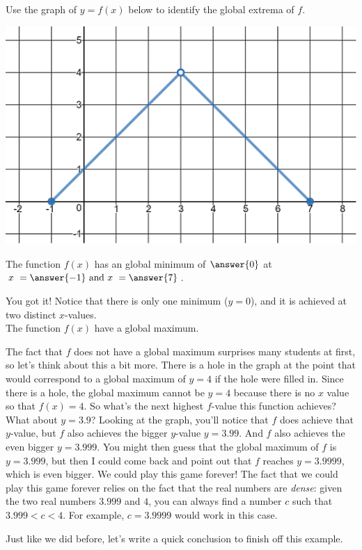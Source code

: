 \documentclass{ximera}
\begin{document}
\begin{exercise}
Use the graph of $y = f(x)$ below to identify the global extrema of $f$.

\begin{center} \includegraphics[scale=0.5]{extrema2new.png} \end{center}

The function $f(x)$ has an global minimum of $\answer{0}$ at $x \ = \answer{-1} \text{ and } x \ = \answer{7}$.  

\begin{exercise}
You got it!  Notice that there is only one minimum ($y=0$), and it is achieved at two distinct $x$-values.  \\

The function $f(x)$  have a global maximum.  

\begin{explanation}
The fact that $f$ does not have a global maximum surprises many students at first, so let's think about this a bit more.  There is a hole in the graph at the point that would correspond to a global maximum of $y=4$ if the hole were filled in.  Since there is a hole, the global maximum cannot be $y=4$ because there is no $x$ value so that $f(x) = 4$.  So what's the next highest $f$-value this function achieves?  What about $y=3.9$?  Looking at the graph, you'll notice that $f$ does achieve that $y$-value, but $f$ also achieves the bigger $y$-value $y=3.99$.  And $f$ also achieves the even bigger $y=3.999$.  You might then guess that the global maximum of $f$ is $y=3.999$, but then I could come back and point out that $f$ reaches $y=3.9999$, which is even bigger.  We could play this game forever!  The fact that we could play this game forever relies on the fact that the real numbers are \textit{dense}: given the two real numbers $3.999$ and $4$, you can always find a number $c$ such that $3.999 < c < 4$.  For example, $c = 3.9999$ would work in this case.  
\end{explanation}
\begin{exercise}
Just like we did before, let's write a quick conclusion to finish off this example. \\


\end{exercise}
\end{exercise}
\end{exercise}
\end{document}
